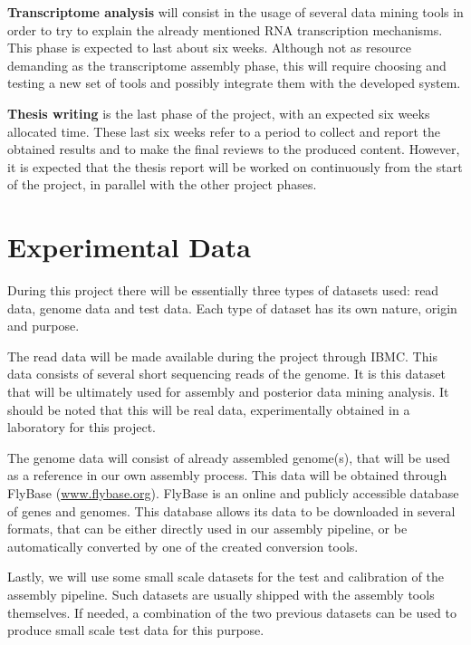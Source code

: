 \begin{description}
  \item \textbf{Transcriptome analysis}
  will consist in the usage of several data mining tools in order to try to
  explain the already mentioned RNA transcription mechanisms. This phase is
  expected to last about six weeks. Although not as resource demanding as the
  transcriptome assembly phase, this will require choosing and testing a new
  set of tools and possibly integrate them with the developed system.

  \item \textbf{Thesis writing}
  is the last phase of the project, with an expected six weeks allocated time.
  These last six weeks refer to a period to collect and report the obtained
  results and to make the final reviews to the produced content. However, it is
  expected that the thesis report will be worked on continuously from the start 
  of the project, in parallel with the other project phases.

\end{description}

\section{Experimental Data}\label{sec:datasets}

During this project there will be essentially three types of datasets used: read
data, genome data and test data. Each type of dataset has its own nature, origin
and purpose.

The read data will be made available during the project through IBMC. This data
consists of several short sequencing reads of the \fly{} genome. It is this
dataset that will be ultimately used for assembly and posterior data mining
analysis. It should be noted that this will be real data, experimentally
obtained in a laboratory for this project.

The genome data will consist of already assembled \fly{} genome(s), that will be
used as a reference in our own assembly process. This data will be obtained
through FlyBase (\url{www.flybase.org}). FlyBase is an online and publicly accessible
database of \Fly{} genes and genomes. This database allows its data to be downloaded in
several formats, that can be either directly used in our assembly pipeline,
or be automatically converted by one of the created conversion tools.

Lastly, we will use some small scale datasets for the test and calibration of the
assembly pipeline. Such datasets are usually shipped with the assembly tools
themselves. If needed, a combination of the two previous datasets can be used to
produce small scale test data for this purpose.

